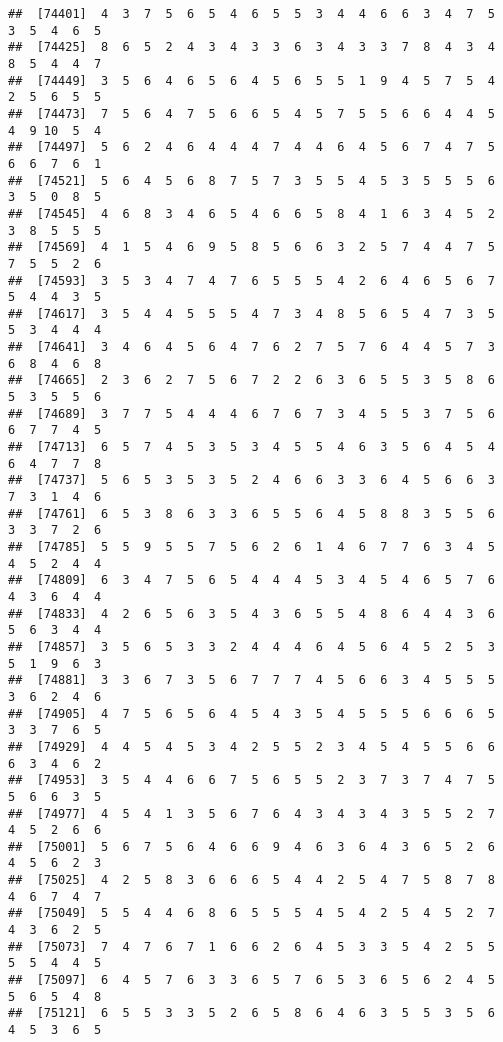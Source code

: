 \documentclass[
]{book}
\begin{document}
\begin{verbatim}
##  [74401]  4  3  7  5  6  5  4  6  5  5  3  4  4  6  6  3  4  7  5  3  5  4  6  5
##  [74425]  8  6  5  2  4  3  4  3  3  6  3  4  3  3  7  8  4  3  4  8  5  4  4  7
##  [74449]  3  5  6  4  6  5  6  4  5  6  5  5  1  9  4  5  7  5  4  2  5  6  5  5
##  [74473]  7  5  6  4  7  5  6  6  5  4  5  7  5  5  6  6  4  4  5  4  9 10  5  4
##  [74497]  5  6  2  4  6  4  4  4  7  4  4  6  4  5  6  7  4  7  5  6  6  7  6  1
##  [74521]  5  6  4  5  6  8  7  5  7  3  5  5  4  5  3  5  5  5  6  3  5  0  8  5
##  [74545]  4  6  8  3  4  6  5  4  6  6  5  8  4  1  6  3  4  5  2  3  8  5  5  5
##  [74569]  4  1  5  4  6  9  5  8  5  6  6  3  2  5  7  4  4  7  5  7  5  5  2  6
##  [74593]  3  5  3  4  7  4  7  6  5  5  5  4  2  6  4  6  5  6  7  5  4  4  3  5
##  [74617]  3  5  4  4  5  5  5  4  7  3  4  8  5  6  5  4  7  3  5  5  3  4  4  4
##  [74641]  3  4  6  4  5  6  4  7  6  2  7  5  7  6  4  4  5  7  3  6  8  4  6  8
##  [74665]  2  3  6  2  7  5  6  7  2  2  6  3  6  5  5  3  5  8  6  5  3  5  5  6
##  [74689]  3  7  7  5  4  4  4  6  7  6  7  3  4  5  5  3  7  5  6  6  7  7  4  5
##  [74713]  6  5  7  4  5  3  5  3  4  5  5  4  6  3  5  6  4  5  4  6  4  7  7  8
##  [74737]  5  6  5  3  5  3  5  2  4  6  6  3  3  6  4  5  6  6  3  7  3  1  4  6
##  [74761]  6  5  3  8  6  3  3  6  5  5  6  4  5  8  8  3  5  5  6  3  3  7  2  6
##  [74785]  5  5  9  5  5  7  5  6  2  6  1  4  6  7  7  6  3  4  5  4  5  2  4  4
##  [74809]  6  3  4  7  5  6  5  4  4  4  5  3  4  5  4  6  5  7  6  4  3  6  4  4
##  [74833]  4  2  6  5  6  3  5  4  3  6  5  5  4  8  6  4  4  3  6  5  6  3  4  4
##  [74857]  3  5  6  5  3  3  2  4  4  4  6  4  5  6  4  5  2  5  3  5  1  9  6  3
##  [74881]  3  3  6  7  3  5  6  7  7  7  4  5  6  6  3  4  5  5  5  3  6  2  4  6
##  [74905]  4  7  5  6  5  6  4  5  4  3  5  4  5  5  5  6  6  6  5  3  3  7  6  5
##  [74929]  4  4  5  4  5  3  4  2  5  5  2  3  4  5  4  5  5  6  6  6  3  4  6  2
##  [74953]  3  5  4  4  6  6  7  5  6  5  5  2  3  7  3  7  4  7  5  5  6  6  3  5
##  [74977]  4  5  4  1  3  5  6  7  6  4  3  4  3  4  3  5  5  2  7  4  5  2  6  6
##  [75001]  5  6  7  5  6  4  6  6  9  4  6  3  6  4  3  6  5  2  6  4  5  6  2  3
##  [75025]  4  2  5  8  3  6  6  6  5  4  4  2  5  4  7  5  8  7  8  4  6  7  4  7
##  [75049]  5  5  4  4  6  8  6  5  5  5  4  5  4  2  5  4  5  2  7  4  3  6  2  5
##  [75073]  7  4  7  6  7  1  6  6  2  6  4  5  3  3  5  4  2  5  5  5  5  4  4  5
##  [75097]  6  4  5  7  6  3  3  6  5  7  6  5  3  6  5  6  2  4  5  5  6  5  4  8
##  [75121]  6  5  5  3  3  5  2  6  5  8  6  4  6  3  5  5  3  5  6  4  5  3  6  5

\end{verbatim}
\end{document}
